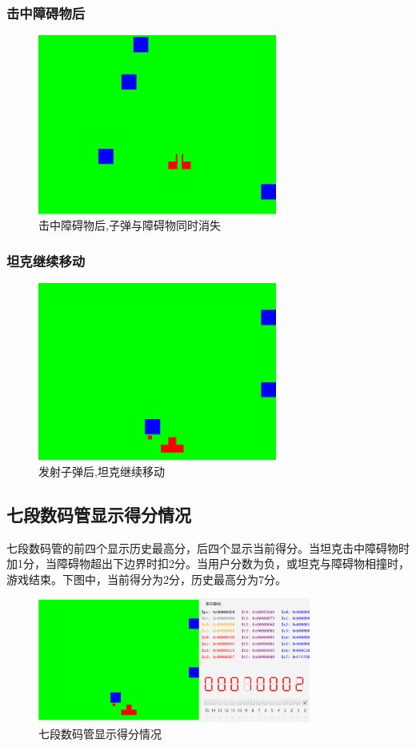 \subsubsection{击中障碍物后}
\begin{figure}[H]
  \centering
  \includegraphics[width=0.7\textwidth]{img/shot4.png}
  \caption{击中障碍物后,子弹与障碍物同时消失
  }\label{fig:shot4}
\end{figure}

\subsubsection{坦克继续移动}
\begin{figure}[H]
  \centering
  \includegraphics[width=0.7\textwidth]{img/shot5.png}
  \caption{发射子弹后,坦克继续移动
  }\label{fig:shot5}
\end{figure}

\subsection{七段数码管显示得分情况}
七段数码管的前四个显示历史最高分，后四个显示当前得分。当坦克击中障碍物时加1分，当障碍物超出下边界时扣2分。当用户分数为负，或坦克与障碍物相撞时，游戏结束。下图中，当前得分为2分，历史最高分为7分。\\

\begin{figure}[H]
  \centering
  \includegraphics[width=0.8\textwidth]{img/score.png}
  \caption{七段数码管显示得分情况
  }\label{fig:score}
\end{figure}



